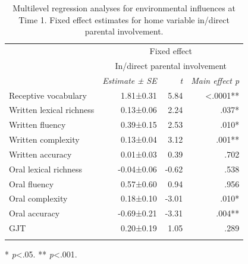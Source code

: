 \documentclass[output=paper,modfonts,nonflat,newtxmath]{langsci/langscibook}
\begin{document}
\begin{table}
	\caption{\label{tab:pfenninger:16} Multilevel regression analyses for environmental influences at Time 1. Fixed effect estimates for home variable in/direct parental involvement.}
	\begin{tabularx}{0.85\textwidth}{l rrr}
		\lsptoprule
		& \multicolumn{3}{c}{Fixed effect}\\
		& \multicolumn{3}{c}{In/direct parental involvement}\\
		\cmidrule{2-4}
		& \textit{Estimate} \textit{±} \textit{SE} & \textit{t}  & \textit{Main effect p}\\
		\cmidrule{1-4}
		Receptive vocabulary & 1.81±0.31 & 5.84 & <.0001** \\
		Written lexical richness & 0.13±0.06 & 2.24 & .037* \\
		Written fluency & 0.39±0.15 & 2.53 & .010*\\
		Written complexity & 0.13±0.04 & 3.12 & .001**\\
		Written accuracy & 0.01±0.03 & 0.39 & .702\\
		Oral lexical richness & -0.04±0.06 & -0.62 & .538\\
		Oral fluency & 0.57±0.60 & 0.94 & .956\\
		Oral complexity & 0.18±0.10 & -3.01 & .010*\\
		Oral accuracy & -0.69±0.21 & -3.31 & .004**\\
		GJT & 0.20±0.19 & 1.05 & .289\\
		\lspbottomrule
	\end{tabularx}

	* \textit{p}<.05.
	** \textit{p}<.001.
\end{table}
\end{document}
